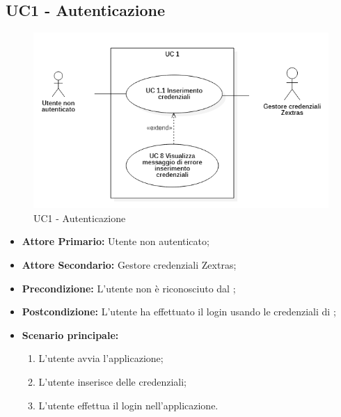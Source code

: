 \subsection{UC1 - Autenticazione}
\begin{figure}[H]
    \centering
    \includegraphics[scale = 0.7]{components/img/UC1.png}
    \caption{UC1 - Autenticazione}
\end{figure}
\begin{itemize}
\item \textbf{Attore Primario:} Utente non autenticato;
\item \textbf{Attore Secondario:} Gestore credenziali Zextras;
\item \textbf{Precondizione:} L'utente non è riconosciuto dal ;
\item \textbf{Postcondizione:} L'utente ha effettuato il login usando le credenziali di ;
\item \textbf{Scenario principale:}
    \begin{enumerate}
    \item L'utente avvia l'applicazione;
    \item L'utente inserisce delle credenziali;
    \item L'utente effettua il login nell'applicazione.
    \end{enumerate}
\end{itemize}
